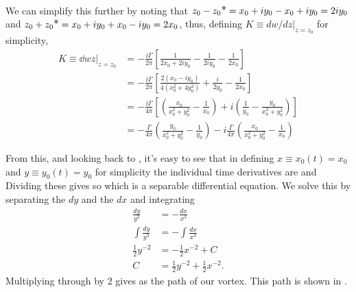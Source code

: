 \documentclass[12pt]{book}
\renewcommand{\star}{{\scalebox{1.1}{*} }}
\begin{document}
{\begin{align*}
\end{align*}
We can simplify this further by noting that $z_0 - z_0\star = x_0 + iy_0-x_0+iy_0=2iy_0$  and  $z_0 + z_0\star = x_0 + iy_0+x_0-iy_0 = 2x_0$, thus, defining $K\equiv dw/dz |_{z=z_0}$ for simplicity,
\begin{align*}
K\equiv\left.\dd{w}{z}\right|_{z=z_0} &= -\frac{i\Gamma}{2\pi}\left[\frac{1}{2x_0+2iy_0} - \frac{1}{2iy_0} - \frac{1}{2x_0}\right] \\
&= -\frac{i\Gamma}{2\pi}\left[\frac{2(x_0 - iy_0)}{4(x_0 ^2 + 4y_0^2)} + \frac{i}{2y_0} - \frac{1}{2x_0}\right] \\
&= -\frac{i\Gamma}{4\pi}\left[ \left( \frac{x_0}{x_0^2 + y_0^2} - \frac{1}{x_0} \right) + i\left(\frac{1}{y_0} - \frac{y_0}{x_0^2 + y_0^2} \right) \right] \\
& = -\frac{\Gamma}{4\pi}\left(\frac{y_0}{x_0^2 + y_0^2}-\frac{1}{y_0} \right) -  i\frac{\Gamma}{4\pi}\left( \frac{x_0}{x_0^2 + y_0^2} - \frac{1}{x_0} \right) 
\end{align*}

From this, and looking back to , it's easy to see that in defining $x\equiv x_0(t) = x_0$ and $y\equiv y_0(t) = y_0$ for simplicity the individual time derivatives are
and 
Dividing these gives
so
which is a separable differential equation.  We solve this by separating the $dy$ and the $dx$ and integrating
\begin{align*}
\frac{dy}{y^3} &= -\frac{dx}{x^3}\\
\int\!\! \frac{dy}{y^3} &= -\int\!\! \frac{dx}{x^3}\\
\frac{1}{2}y^{-2} &= -\frac{1}{2}x^{-2} + C \\
C&=  \frac{1}{2}y^{-2} + \frac{1}{2}x^{-2}.
\end{align*}
Multiplying through by 2 gives
as the path of our vortex. This path is shown in .

}
\end{document}
